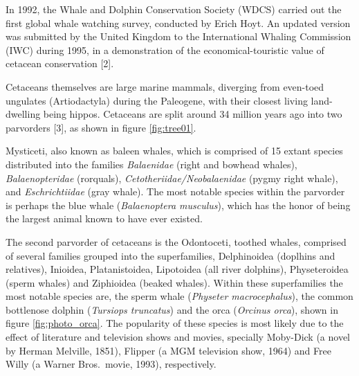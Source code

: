 \documentclass[10pt,letterpaper]{article}
\begin{document}
In 1992, the Whale and Dolphin Conservation Society (WDCS) carried out
the first global whale watching survey, conducted by Erich Hoyt. An
updated version was submitted by the United Kingdom to the International
Whaling Commission (IWC) during 1995, in a demonstration of the
economical-touristic value of cetacean conservation {[}2{]}.

Cetaceans themselves are large marine mammals, diverging from even-toed
ungulates (Artiodactyla) during the Paleogene, with their closest living
land-dwelling being hippos. Cetaceans are split around 34 million years
ago into two parvorders {[}3{]}, as shown in figure \ref{fig:tree01}.

Mysticeti, also known as baleen whales, which is comprised of 15 extant
species distributed into the families \emph{Balaenidae} (right and
bowhead whales), \emph{Balaenopteridae} (rorquals),
\emph{Cetotheriidae/Neobalaenidae} (pygmy right whale), and
\emph{Eschrichtiidae} (gray whale). The most notable species within the
parvorder is perhaps the blue whale (\emph{Balaenoptera musculus}),
which has the honor of being the largest animal known to have ever
existed.

The second parvorder of cetaceans is the Odontoceti, toothed whales,
comprised of several families grouped into the superfamilies,
Delphinoidea (doplhins and relatives), Inioidea, Platanistoidea,
Lipotoidea (all river dolphins), Physeteroidea (sperm whales) and
Ziphioidea (beaked whales). Within these superfamilies the most notable
species are, the sperm whale (\emph{Physeter macrocephalus}), the common
bottlenose dolphin (\emph{Tursiops truncatus}) and the orca
(\emph{Orcinus orca}), shown in figure \ref{fig:photo_orca}. The
popularity of these species is most likely due to the effect of
literature and television shows and movies, specially Moby-Dick (a novel
by Herman Melville, 1851), Flipper (a MGM television show, 1964) and
Free Willy (a Warner Bros.~movie, 1993), respectively.
\end{document}
